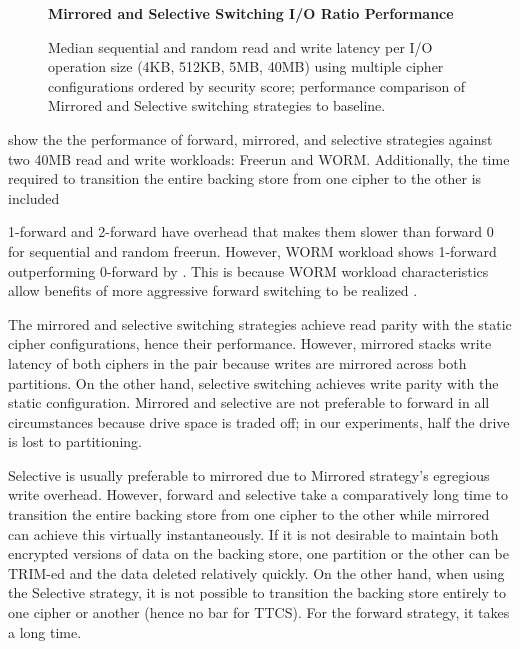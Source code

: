 \begin{figure}[ht]
   \textbf{Mirrored and Selective Switching I/O Ratio Performance}\par\medskip
   \centering
   {} \caption{Median sequential
   and random read and write latency per I/O operation size (4KB, 512KB, 5MB,
   40MB) using multiple cipher configurations ordered by security score;
   performance comparison of Mirrored and Selective switching strategies to
   baseline.}
  \label{fig:mirrored-selective-baseline}
\end{figure}

 show the the performance of forward, mirrored, and
selective strategies against two 40MB read and write workloads: Freerun and
WORM.  Additionally, the time required to
transition the entire backing store from one cipher to the other is included

1-forward and 2-forward have overhead that makes them slower than forward 0 for
sequential and random freerun. However, WORM workload shows 1-forward
outperforming 0-forward by . This is
because WORM workload characteristics allow benefits of more aggressive forward
switching to be realized .

The mirrored and selective switching strategies achieve read parity with the
static cipher configurations, hence their performance. However, mirrored stacks
write latency of both ciphers in the pair because writes are mirrored across
both partitions. On the other hand, selective switching achieves write parity
with the static configuration. Mirrored and selective are not preferable to
forward in all circumstances because drive space is traded off; in our
experiments, half the drive is lost to partitioning.


Selective is usually preferable to mirrored due to Mirrored strategy's egregious
write overhead. However, forward and selective take a comparatively long time to
transition the entire backing store from one cipher to the other while mirrored
can achieve this virtually instantaneously. If it is not desirable to maintain
both encrypted versions of data on the backing store, one partition or the other
can be TRIM-ed and the data deleted relatively quickly. On the other hand, when
using the Selective strategy, it is not possible to transition the backing store
entirely to one cipher or another (hence no bar for TTCS). For the forward
strategy, it takes a long time. 
